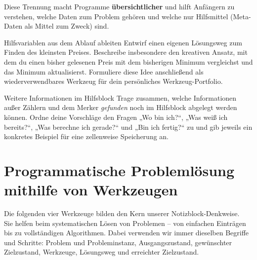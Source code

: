 \documentclass{article}
\begin{document}
        
Diese Trennung macht Programme \textbf{übersichtlicher} und hilft Anfängern zu verstehen, welche Daten zum Problem gehören und welche nur Hilfsmittel (Meta-Daten als Mittel zum Zweck) sind.


        
\begin{uebung}{Hilfsvariablen aus dem Ablauf ableiten}
Entwirf einen eigenen Lösungsweg zum Finden des kleinsten Preises. Beschreibe insbesondere den kreativen Ansatz, mit dem du einen bisher gelesenen Preis mit dem bisherigen Minimum vergleichst und das Minimum aktualisierst. Formuliere diese Idee anschließend als wiederverwendbares Werkzeug für dein persönliches Werkzeug-Portfolio.
\end{uebung}

\begin{uebung}{Weitere Informationen im Hilfsblock}
Trage zusammen, welche Informationen außer Zählern und dem Merker \emph{gefunden} noch im Hilfsblock abgelegt werden können. Ordne deine Vorschläge den Fragen „Wo bin ich?“, „Was weiß ich bereits?“, „Was berechne ich gerade?“ und „Bin ich fertig?“ zu und gib jeweils ein konkretes Beispiel für eine zellenweise Speicherung an.
\end{uebung}


      
    

    

      
      \newpage
      \section{Programmatische Problemlösung mithilfe von Werkzeugen}

    Die folgenden vier Werkzeuge bilden den Kern unserer Notizblock-Denkweise.\\
    Sie helfen beim systematischen Lösen von Problemen – von einfachen Einträgen bis zu vollständigen Algorithmen. Dabei verwenden wir immer dieselben Begriffe und Schritte: Problem und Probleminstanz, Ausgangszustand, gewünschter Zielzustand, Werkzeuge, Lösungsweg und erreichter Zielzustand.
\end{document}
